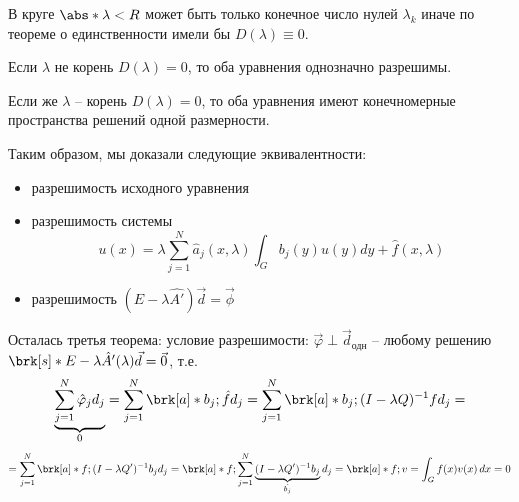 \begin{itemize}
  В круге $\abs*{\lambda} < R$ может быть только конечное число нулей $\lambda_{k}$ иначе по теореме о единственности имели бы $D(\lambda) \equiv 0$.
  
  Если $\lambda$ не корень $D(\lambda) = 0$, то оба уравнения однозначно разрешимы.
  
  Если же $\lambda$ -- корень $D(\lambda) = 0$, то оба уравнения имеют конечномерные пространства решений одной размерности.
  
  Таким образом, мы доказали следующие эквивалентности:
  \begin{itemize}
    \item разрешимость исходного уравнения
    \item разрешимость системы
    $$u(x) = \lambda \sum_{j = 1}^{N}\hat{a}_{j}(x,\lambda)\int_{G}b_{j}(y)u(y)dy + \hat{f}(x,\lambda)$$
    \item разрешимость $(E - \lambda \hat{A'})\vec{d} = \vec{\phi}$
  \end{itemize}
\end{itemize}
  
  Осталась третья теорема: условие разрешимости: $\vec{\varphi} \perp \vec{d}_{\text{одн}}$ -- любому решению $\brk[s]*{E - \lambda\hat{A}'(\lambda)} \vec{d} = \vec{0}$, т.е.
  $$ \underbrace{\sum_{j=1}^{N}\hat{\varphi}_{j}d_{j}}_{0} = \sum_{j=1}^{N}\brk[a]*{b_{j}; \hat{f}}d_{j} = \sum_{j=1}^{N}\brk[a]*{b_{j}; (I - \lambda Q)^{-1}f} d_{j} =$$
  $$= \sum_{j=1}^{N}\brk[a]*{f; (I - \lambda Q')^{-1}b_{j}} d_{j}  = \brk[a]*{f; \sum_{j=1}^{N}\underbrace{(I - \lambda Q')^{-1}b_{j}}_{\hat{b_{j}}}d_{j}} = \brk[a]*{f; v} = \int_{G}f(x)v(x) \, dx = 0$$